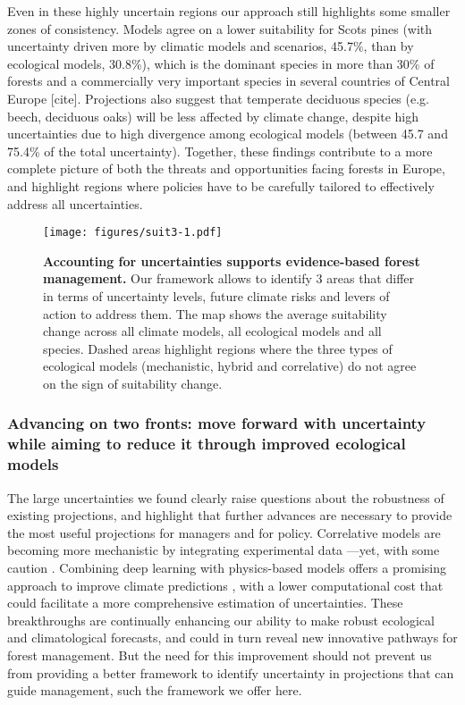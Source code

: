 \documentclass[11pt,letter]{article}
\begin{document}
Even in these highly uncertain regions our approach still highlights some smaller zones of consistency. Models agree on a lower suitability for Scots pines (with uncertainty driven more by climatic models and scenarios, 45.7\%, than by ecological models, 30.8\%), which is the dominant species in more than 30\% of forests and a commercially very important species in several countries of Central Europe [cite]. %
Projections also suggest that temperate deciduous species (e.g. beech, deciduous oaks) will be less affected by climate change, despite high uncertainties due to high divergence among ecological models (between 45.7 and 75.4\% of the total uncertainty). Together, these findings contribute to a more complete picture of both the threats and opportunities facing forests in Europe, and highlight regions where policies have to be carefully tailored to effectively address all uncertainties.



\begin{figure}
	\centering
	\texttt{[image: figures/suit3-1.pdf]}
	\caption{\textbf{Accounting for uncertainties supports evidence-based forest management.} Our framework allows to identify 3 areas that differ in terms of uncertainty levels, future climate risks and levers of action to address them. The map shows the average suitability change across all climate models, all ecological models and all species. Dashed areas highlight regions where the three types of ecological models (mechanistic, hybrid and correlative) do not agree on the sign of suitability change.}
	\label{fig:manag}
\end{figure}

\subsubsection*{Advancing on two fronts: move forward with uncertainty while aiming to reduce it through improved ecological models}

The large uncertainties we found clearly raise questions about the robustness of existing projections, and highlight that further advances are necessary to provide the most useful projections for managers and for policy. 
Correlative models are becoming more mechanistic by integrating experimental data \citep{Wagner2023}---yet, with some caution \citep{Chevalier2024a}. Combining deep learning with physics-based models offers a promising approach to improve climate predictions \citep{Kochkov2024}, with a lower computational cost that could facilitate a more comprehensive estimation of uncertainties. These breakthroughs are continually enhancing our ability to make robust ecological and climatological forecasts, and could in turn reveal new innovative pathways for forest management. But the need for this improvement should not prevent us from providing a better framework to identify uncertainty in projections that can guide management, such the framework we offer here.  
\end{document}
